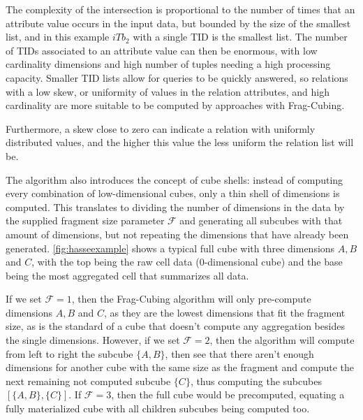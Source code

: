 The complexity of the intersection is proportional to the number of times that an attribute value occurs in the input data, but bounded by the size of the smallest list, and in this example $iTb_2$ with a single TID is the smallest list.
The number of TIDs associated to an attribute value can then be enormous, with low cardinality dimensions and high number of tuples needing a high processing capacity.
Smaller TID lists allow for queries to be quickly answered, so relations with a low skew, or uniformity of values in the relation attributes, and high cardinality are more suitable to be computed by approaches with Frag-Cubing.

Furthermore, a skew close to zero can indicate a relation with uniformly distributed values, and the higher this value the less uniform the relation list will be.

The algorithm also introduces the concept of cube shells: instead of computing every combination of low-dimensional cubes, only a thin shell of dimensions is computed.
This translates to dividing the number of dimensions in the data by the supplied fragment size parameter $\mathcal{F}$ and generating all subcubes with that amount of dimensions, but not repeating the dimensions that have already been generated.
\autoref{fig:hasseexample} shows a typical full cube with three dimensions $A, B$ and $C$, with the top being the raw cell data ($0$-dimensional cube) and the base being the most aggregated cell that summarizes all data.

If we set $\mathcal{F} = 1$, then the Frag-Cubing algorithm will only pre-compute dimensions $A, B$ and $C$, as they are the lowest dimensions that fit the fragment size, as is the standard of a cube that doesn't compute any aggregation besides the single dimensions.
However, if we set $\mathcal{F} = 2$, then the algorithm will compute from left to right the subcube $\{A, B\}$, then see that there aren't enough dimensions for another cube with the same size as the fragment and compute the next remaining not computed subcube $\{C\}$, thus computing the subcubes $[\{A, B\}, \{C\}]$.
If $\mathcal{F} = 3$, then the full cube would be precomputed, equating a fully materialized cube with all children subcubes being computed too.


